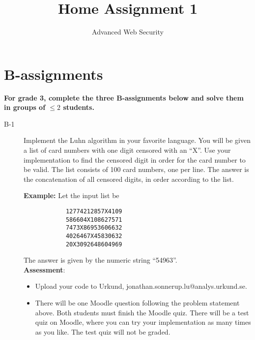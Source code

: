 \documentclass{article}
\begin{document}
	
	\title{Home Assignment 1}
	\author{Advanced Web Security}
	\date{\the\year}
	
	\maketitle
	
	\section*{B-assignments}
	\textbf{For grade 3, complete the three B-assignments below and solve them in groups of $\leq 2$ students.}
	
	\begin{description}
		
		\item[B-1]{Implement the Luhn algorithm in your favorite language. You will be given
			a list of card numbers with one digit censored with an ``X''. Use your implementation to find the
			censored digit in order for the card number to be valid. The list consists of 100 card numbers,
			one per line. The answer is the concatenation of all censored digits, 
			in order according to the list.
			
			\textbf{Example:} Let the input list be
			\begin{verbatim}
			12774212857X4109
			586604X108627571
			7473X86953606632
			4026467X45830632
			20X3092648604969
			\end{verbatim}
			The answer is given by the numeric string ``54963''.\\
			\textbf{Assessment}:
			\begin{itemize}
				\item Upload your code to Urkund, jonathan.sonnerup.lu@analys.urkund.se.
				\item There will be one Moodle question following the problem statement above. Both students must finish the Moodle quiz.	There will be a test quiz on Moodle, where you can try your implementation as many times as you like. The test quiz will not be graded.
			\end{itemize}
		}
		

\end{description}
\end{document}
